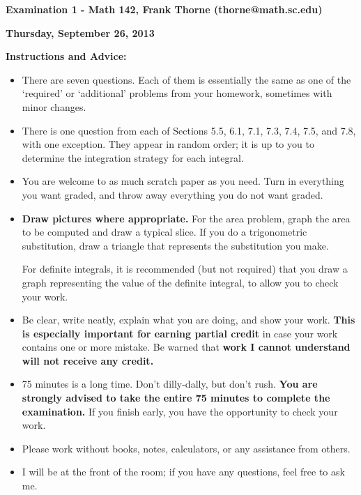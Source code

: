 \documentclass[14pt]{article}
\begin{document}
\setlength{\topmargin}{-2mm}





\begin{center}{\bf Examination 1 - Math 142, Frank Thorne (thorne@math.sc.edu)}
\end{center}
\begin{center}
{\bf Thursday, September 26, 2013}
\end{center}

{\bf Instructions and Advice:} 

\begin{itemize}
\item
There are seven questions. Each of them is essentially the same as one of the `required'
or `additional' problems from your homework, sometimes with minor changes.
\item
There is one question from each of Sections 5.5, 6.1, 7.1, 7.3, 7.4, 7.5, and 7.8,
with one exception. They appear in random order; it is up to you to determine the integration strategy for each integral.
\item
You are welcome to as much scratch paper as you need. Turn in everything you want graded,
and throw away everything you do not want graded.
\item
{\bf Draw pictures where appropriate.} For the area problem, graph the area to be computed
and draw a typical slice. If you do a trigonometric substitution, draw a triangle that
represents the substitution you make.

For definite integrals, it is recommended (but not required) that you draw a graph
representing the value of the definite integral, to allow you to check your work.
\item
Be clear, write neatly, explain what you are doing, and show your work. {\bf This is especially
important for earning partial credit} in case your work contains one or more mistake.
Be warned that {\bf work I cannot understand will not receive any credit.}
\item
75 minutes is a long time. Don't dilly-dally, but don't rush. {\bf You are strongly advised
to take the entire 75 minutes to complete the examination.} If you finish early, you have the
opportunity to check your work.
\item
Please work without books, notes, calculators, or any assistance from others. 
\item
I will be at the front of the room; if you have
any questions, feel free to ask me. 
\end{itemize}
\end{document}

